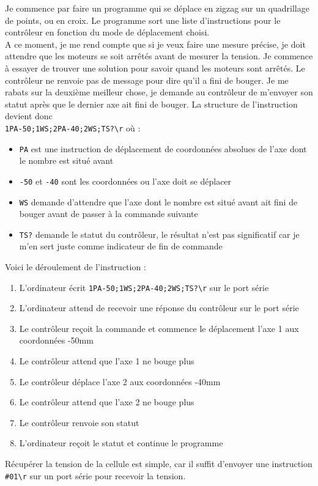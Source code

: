 \documentclass[12pt]{article}
\begin{document}
Je commence par faire un programme qui se déplace en zigzag sur un quadrillage de points, ou en croix.
Le programme sort une liste d'instructions pour le contrôleur en fonction du mode de déplacement choisi.\\
A ce moment, je me rend compte que si je veux faire une mesure précise, je doit attendre que les moteurs se soit arrêtés avant de mesurer la tension.
Je commence à essayer de trouver une solution pour savoir quand les moteurs sont arrêtés.
Le contrôleur ne renvoie pas de message pour dire qu'il a fini de bouger.
Je me rabats sur la deuxième meilleur chose, je demande au contrôleur de m'envoyer son statut après que le dernier axe ait fini de bouger.
La structure de l'instruction devient donc \\
\verb|1PA-50;1WS;2PA-40;2WS;TS?\r| où :
\begin{itemize}
	\item \verb|PA| est une instruction de déplacement de coordonnées absolues de l'axe dont le nombre est situé avant
	\item \verb|-50| et \verb|-40| sont les coordonnées ou l'axe doit se déplacer
	\item \verb|WS| demande d'attendre que l'axe dont le nombre est situé avant ait fini de bouger avant de passer à la commande suivante
	\item \verb|TS?| demande le statut du contrôleur, le résultat n'est pas significatif car je m'en sert juste comme indicateur de fin de commande
\end{itemize}
Voici le déroulement de l'instruction :
\begin{enumerate}
	\item L'ordinateur écrit \verb|1PA-50;1WS;2PA-40;2WS;TS?\r| sur le port série
	\item L'ordinateur attend de recevoir une réponse du contrôleur sur le port série
	\item Le contrôleur reçoit la commande et commence le déplacement l'axe 1 aux coordonnées -50mm
	\item Le contrôleur attend que l'axe 1 ne bouge plus
	\item Le contrôleur déplace l'axe 2 aux coordonnées -40mm
	\item Le contrôleur attend que l'axe 2 ne bouge plus
	\item Le contrôleur renvoie son statut
	\item L'ordinateur reçoit le statut et continue le programme
\end{enumerate}
Récupérer la tension de la cellule est simple, car il suffit d'envoyer une instruction \verb|#01\r| sur un port série pour recevoir la tension.
\end{document}
